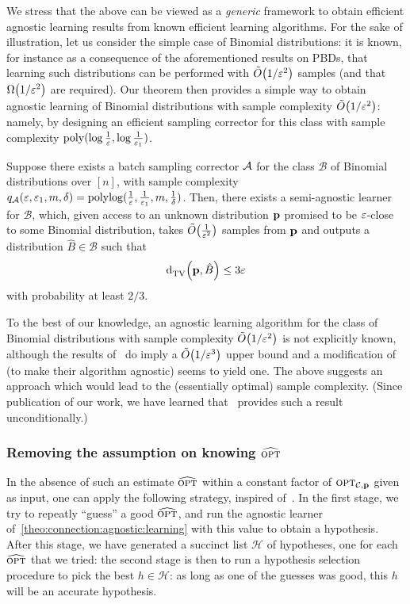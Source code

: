 We stress that the above can be viewed as a \emph{generic} framework to obtain efficient agnostic learning results from known efficient learning algorithms.
For the sake of illustration, let us consider the simple case of Binomial distributions: it is known, for instance as a consequence of the aforementioned results on PBDs, that learning such distributions can be performed with $\tildeO{1/\eps^2}$ samples (and that $\bigOmega{1/\eps^2}$ are required). Our theorem then provides a simple way to obtain agnostic learning of Binomial distributions with sample complexity $\tildeO{1/\eps^2}$: namely, by designing  an efficient sampling corrector for this class with sample complexity $\operatorname*{poly}(\log\frac{1}{\varepsilon},\log\frac{1}{\varepsilon_1})$.


\begin{corollary}
Suppose there exists a batch sampling corrector $\mathcal{A}$ for the class $\mathcal{B}$ of Binomial distributions over $[n]$, with sample complexity $q_\mathcal{A}(\varepsilon,\varepsilon_1,m,\delta)=\operatorname*{poly}\!\log(\frac{1}{\varepsilon},\frac{1}{\varepsilon_1},m,\frac{1}{\delta})$.
Then, there exists a semi-agnostic learner for $\mathcal{B}$, which, given access to an unknown distribution $\mathbf{p}$ promised to be $\varepsilon$-close to some Binomial distribution, takes $\tildeO{\frac{1}{\eps^2}}$ samples from $\mathbf{p}$ and outputs a distribution $\hat{B}\in\mathcal{B}$ such that
\[
  {\operatorname{d}_{\textrm{TV}}^{}\!\left({\mathbf{p}, \hat{B}}\right)} \leq 3\varepsilon
\]
with probability at least $2/3$.
\end{corollary}
\noindent To the best of our knowledge, an agnostic learning algorithm for the class of Binomial distributions with sample complexity $\tildeO{1/\eps^2}$ is not explicitly known, although the results of~\cite{CDSS:14} do imply a $\tildeO{1/\eps^3}$ upper bound and a modification of~\cite{DDS:PBD:12} (to make their algorithm agnostic) seems to yield one. The above suggests an approach which would lead to the (essentially optimal) sample complexity. (Since publication of our work, we have learned that~\cite{ADLS:15} provides such a result unconditionally.)

\subsubsection{Removing the assumption on knowing \texorpdfstring{$\widehat{{\textsc{opt}}}$}{an estimate of \opt}}

In the absence of such an estimate $\widehat{{\textsc{opt}}}$ within a constant factor of ${\textsc{opt}}_{\mathcal{C}, \mathbf{p}}$ given as input, one can apply the following strategy, inspired of~\cite[Theorem 6]{CDSS:14:NIPS}. In the first stage, we try to repeatly ``guess'' a good $\widehat{{\textsc{opt}}}$, and run the agnostic learner of~\cref{theo:connection:agnostic:learning} with this value to obtain a hypothesis. After this stage, we have generated a succinct list $\mathcal{H}$ of hypotheses, one for each $\widehat{{\textsc{opt}}}$ that we tried: the second stage is then to run a hypothesis selection procedure to pick the best $h\in\mathcal{H}$: as long as one of the guesses was good, this $h$ will be an accurate hypothesis.


